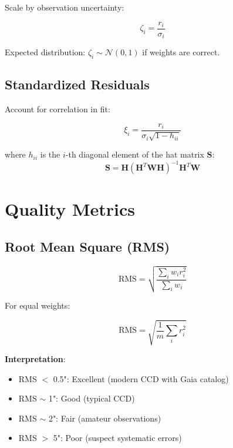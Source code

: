 Scale by observation uncertainty:

\begin{equation}
    \zeta_i = \frac{r_i}{\sigma_i}
\end{equation}

Expected distribution: $\zeta_i \sim \mathcal{N}(0, 1)$ if weights are correct.

\subsection{Standardized Residuals}

Account for correlation in fit:

\begin{equation}
    \xi_i = \frac{r_i}{\sigma_i \sqrt{1 - h_{ii}}}
\end{equation}

where $h_{ii}$ is the $i$-th diagonal element of the hat matrix $\mathbf{S}$:
\begin{equation}
    \mathbf{S} = \mathbf{H}(\mathbf{H}^T\mathbf{W}\mathbf{H})^{-1}\mathbf{H}^T\mathbf{W}
\end{equation}

\section{Quality Metrics}

\subsection{Root Mean Square (RMS)}

\begin{equation}
    \text{RMS} = \sqrt{\frac{\sum_i w_i r_i^2}{\sum_i w_i}}
\end{equation}

For equal weights:

\begin{equation}
    \text{RMS} = \sqrt{\frac{1}{m} \sum_i r_i^2}
\end{equation}

\textbf{Interpretation}:
\begin{itemize}
    \item RMS $<$ 0.5": Excellent (modern CCD with Gaia catalog)
    \item RMS $\sim$ 1": Good (typical CCD)
    \item RMS $\sim$ 2": Fair (amateur observations)
    \item RMS $>$ 5": Poor (suspect systematic errors)
\end{itemize}

